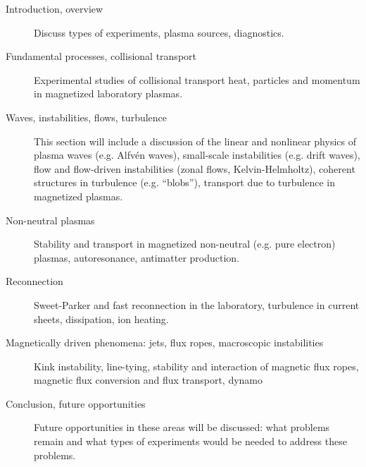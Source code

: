 \documentclass[12pt]{article}
\begin{document}

\begin{description}
\item[Introduction, overview]  Discuss types of experiments,
  plasma sources, diagnostics. 
\item[Fundamental processes, collisional transport]  Experimental
  studies of collisional transport heat, particles and momentum in
  magnetized laboratory plasmas.
\item[Waves, instabilities, flows, turbulence]  This
  section will include a discussion of the linear and nonlinear
  physics of plasma waves (e.g. Alfv\'{e}n waves), small-scale instabilities (e.g. drift
  waves), flow and flow-driven instabilities (zonal flows,
  Kelvin-Helmholtz), coherent structures in turbulence
  (e.g. ``blobs''), transport due to turbulence in magnetized
  plasmas. 
\item[Non-neutral plasmas] Stability and transport in magnetized non-neutral
  (e.g. pure electron) plasmas, autoresonance, antimatter production.
\item[Reconnection]  Sweet-Parker and fast reconnection in the
  laboratory, turbulence in current sheets, dissipation, ion heating.
\item[Magnetically driven phenomena: jets, flux ropes, macroscopic
  instabilities]  Kink instability, line-tying, stability and
  interaction of magnetic flux ropes, magnetic flux conversion and flux transport, dynamo
\item[Conclusion, future opportunities] Future opportunities in these areas will be discussed: what problems
remain and what types of experiments would be needed to address these
problems. 

\end{description}
\end{document}
